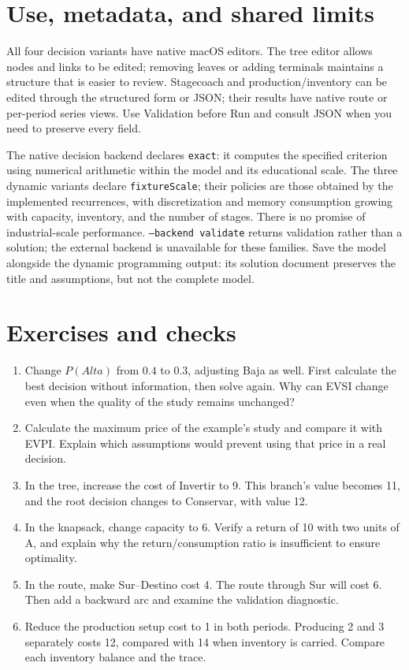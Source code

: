 \section{Use, metadata, and shared limits}
All four decision variants have native macOS editors. The tree editor allows
nodes and links to be edited; removing leaves or adding terminals maintains a
structure that is easier to review. Stagecoach and production/inventory can be
edited through the structured form or JSON; their results have native route or
per-period series views. Use Validation before Run and consult JSON when you
need to preserve every field.

The native decision backend declares \texttt{exact}: it computes the specified
criterion using numerical arithmetic within the model and its educational scale.
The three dynamic variants declare \texttt{fixtureScale}; their policies are
those obtained by the implemented recurrences, with discretization and memory
consumption growing with capacity, inventory, and the number of stages. There
is no promise of industrial-scale performance. \texttt{--backend validate}
returns validation rather than a solution; the external backend is unavailable
for these families. Save the model alongside the dynamic programming output:
its solution document preserves the title and assumptions, but not the complete
model.

\section{Exercises and checks}
\begin{enumerate}
 \item Change $P(Alta)$ from $0.4$ to $0.3$, adjusting Baja as well. First
 calculate the best decision without information, then solve again. Why can
 EVSI change even when the quality of the study remains unchanged?
 \item Calculate the maximum price of the example's study and compare it
 with EVPI. Explain which assumptions would prevent using that price in a
 real decision.
 \item In the tree, increase the cost of Invertir to 9. This branch's value
 becomes 11, and the root decision changes to Conservar, with value 12.
 \item In the knapsack, change capacity to 6. Verify a return of 10 with two
 units of A, and explain why the return/consumption ratio is insufficient to
 ensure optimality.
 \item In the route, make Sur--Destino cost 4. The route through Sur will
 cost 6. Then add a backward arc and examine the validation diagnostic.
 \item Reduce the production setup cost to 1 in both periods. Producing 2
 and 3 separately costs 12, compared with 14 when inventory is carried.
 Compare each inventory balance and the trace.
\end{enumerate}
